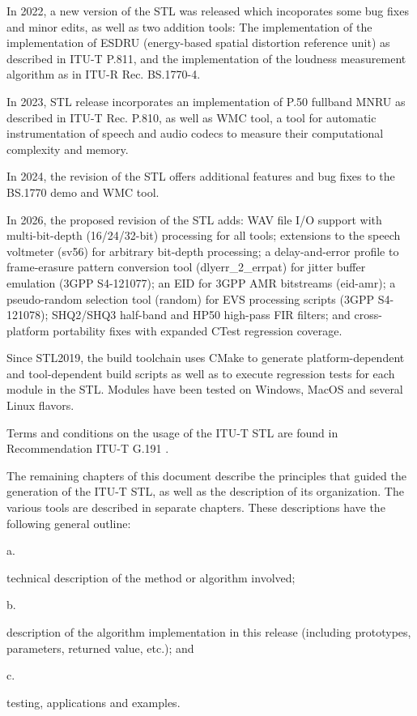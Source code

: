 In 2022, a new version of the STL was released which incoporates some bug fixes and minor edits, as well as two addition tools:
The implementation of the implementation of ESDRU (energy-based spatial distortion reference unit) as described in ITU-T P.811, and the implementation of the loudness measurement algorithm as in ITU-R Rec. BS.1770-4.

In 2023, STL release incorporates an implementation of P.50 fullband MNRU as described in ITU-T Rec. P.810, as well as WMC tool, a tool for automatic instrumentation of speech and audio codecs to measure their computational complexity and memory.

In 2024, the revision of the STL offers additional features and bug fixes to the BS.1770 demo and WMC tool.

In 2026, the proposed revision of the STL adds: WAV file I/O support with multi-bit-depth (16/24/32-bit) processing for all tools; extensions to the speech voltmeter (sv56) for arbitrary bit-depth processing; a delay-and-error profile to frame-erasure pattern conversion tool (dlyerr\_2\_errpat) for jitter buffer emulation (3GPP S4-121077); an EID for 3GPP AMR bitstreams (eid-amr); a pseudo-random selection tool (random) for EVS processing scripts (3GPP S4-121078); SHQ2/SHQ3 half-band and HP50 high-pass FIR filters; and cross-platform portability fixes with expanded CTest regression coverage.

Since STL2019, the build toolchain uses CMake to generate platform-dependent and tool-dependent build scripts as well as to execute regression tests for each module in the STL.
Modules have been tested on Windows, MacOS and several Linux flavors.

Terms and conditions on the usage of the ITU-T STL are found in Recommendation ITU-T G.191 \cite{G.191}.

The remaining chapters of this document describe the principles that guided the generation of the ITU-T STL, as well as the description of its organization.
The various tools are described in separate chapters.
These descriptions have the following general outline:

 a. \parbox[t]{140mm}{
               technical description of the method or algorithm involved;}

 b. \parbox[t]{140mm}{
               description of the algorithm implementation in this release (including prototypes, parameters, returned value, etc.); and }

 c. \parbox[t]{140mm}{
               testing, applications and examples.}




